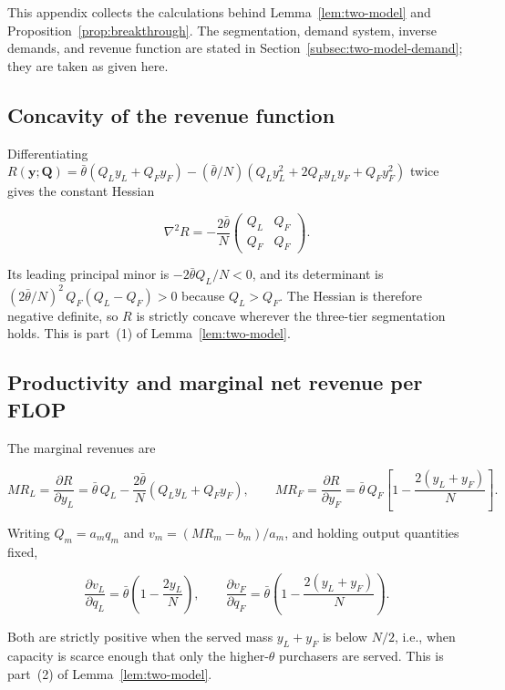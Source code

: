 \documentclass[11pt]{article}
\begin{document}
This appendix collects the calculations behind Lemma~\ref{lem:two-model} and Proposition~\ref{prop:breakthrough}. The segmentation, demand system, inverse demands, and revenue function are stated in Section~\ref{subsec:two-model-demand}; they are taken as given here.

\subsection{Concavity of the revenue function}

Differentiating $R(\mathbf y;\mathbf Q)=\bar\theta(Q_L y_L+Q_F y_F)-(\bar\theta/N)(Q_L y_L^{2}+2Q_F y_L y_F+Q_F y_F^{2})$ twice gives the constant Hessian

\begin{equation}\nabla^{2}R=-\frac{2\bar\theta}{N}\begin{pmatrix}Q_L & Q_F\\ Q_F & Q_F\end{pmatrix}.\end{equation}

Its leading principal minor is $-2\bar\theta Q_L/N<0$, and its determinant is $(2\bar\theta/N)^{2}\,Q_F(Q_L-Q_F)>0$ because $Q_L>Q_F$. The Hessian is therefore negative definite, so $R$ is strictly concave wherever the three-tier segmentation holds. This is part~(1) of Lemma~\ref{lem:two-model}.

\subsection{Productivity and marginal net revenue per FLOP}

The marginal revenues are

\begin{equation}MR_L=\frac{\partial R}{\partial y_L}=\bar\theta\,Q_L-\frac{2\bar\theta}{N}\left(Q_L y_L+Q_F y_F\right),\qquad MR_F=\frac{\partial R}{\partial y_F}=\bar\theta\,Q_F\left[1-\frac{2(y_L+y_F)}{N}\right].\end{equation}

Writing $Q_m=a_m q_m$ and $v_m=(MR_m-b_m)/a_m$, and holding output quantities fixed,

\begin{equation}\frac{\partial v_L}{\partial q_L}=\bar\theta\left(1-\frac{2y_L}{N}\right),\qquad \frac{\partial v_F}{\partial q_F}=\bar\theta\left(1-\frac{2(y_L+y_F)}{N}\right).\end{equation}

Both are strictly positive when the served mass $y_L+y_F$ is below $N/2$, i.e., when capacity is scarce enough that only the higher-$\theta$ purchasers are served. This is part~(2) of Lemma~\ref{lem:two-model}.
\end{document}
